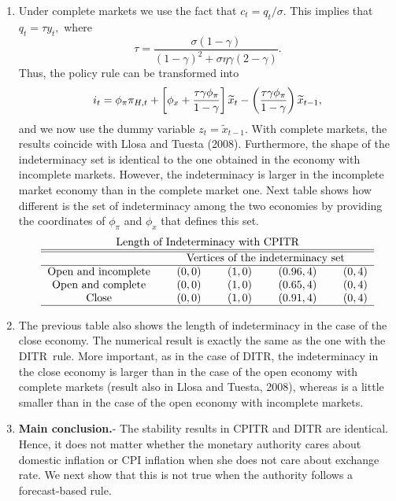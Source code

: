 \documentclass{article}
\begin{document}
\begin{enumerate}
\item Under complete markets we use the fact that $c_{t}=q_{t}/\sigma .$
This implies that $q_{t}=\tau y_{t},$ where 
\begin{equation*}
\tau =\frac{\sigma \left( 1-\gamma \right) }{\left( 1-\gamma \right)
^{2}+\sigma \eta \gamma \left( 2-\gamma \right) }.
\end{equation*}%
Thus, the policy rule can be transformed into%
\begin{equation*}
i_{t}=\phi _{\pi }\pi _{H,t}+\left[ \phi _{x}+\frac{\tau \gamma \phi _{\pi }%
}{1-\gamma }\right] \widetilde{x}_{t}-\left( \frac{\tau \gamma \phi _{\pi }}{%
1-\gamma }\right) \widetilde{x}_{t-1},
\end{equation*}%
and we now use the dummy variable $z_{t}=\widetilde{x}_{t-1}.$ With complete
markets, the results coincide with Llosa and Tuesta (2008). Furthermore, the
shape of the indeterminacy set is identical to the one obtained in the
economy with incomplete markets. However, the indeterminacy is larger in the
incomplete market economy than in the complete market one. Next table shows
how different is the set of indeterminacy among the two economies by
providing the coordinates of $\phi _{\pi }$ and $\phi _{x}$ that defines
this set.%
\begin{equation*}
\begin{tabular}{lcccccccc}
\multicolumn{9}{c}{Length of Indeterminacy with CPITR} \\ \hline\hline
& \multicolumn{8}{c}{Vertices of the indeterminacy set} \\ \hline
\multicolumn{1}{c}{Open and incomplete} &  & $\left( 0,0\right) $ &  & $%
\left( 1,0\right) $ &  & $\left( 0.96,4\right) $ &  & $\left( 0,4\right) $
\\ 
\multicolumn{1}{c}{Open and complete} &  & $\left( 0,0\right) $ &  & $\left(
1,0\right) $ &  & $\left( 0.65,4\right) $ &  & $\left( 0,4\right) $ \\ 
\multicolumn{1}{c}{Close} &  & $\left( 0,0\right) $ &  & $\left( 1,0\right) $
&  & $\left( 0.91,4\right) $ &  & $\left( 0,4\right) $ \\ \hline
\end{tabular}%
\end{equation*}

\item The previous table also shows the length of indeterminacy in the case
of the close economy. The numerical result is exactly the same as the one
with the DITR\ rule. More important, as in the case of DITR, the
indeterminacy in the close economy is larger than in the case of the open
economy with complete markets (result also in Llosa and Tuesta, 2008),
whereas is a little smaller than in the case of the open economy with
incomplete markets.

\item \textbf{Main conclusion.}- The stability results in CPITR and DITR are
identical. Hence, it does not matter whether the monetary authority cares
about domestic inflation or CPI inflation when she does not care about
exchange rate. We next show that this is not true when the authority follows
a forecast-based rule.
\end{enumerate}
\end{document}
